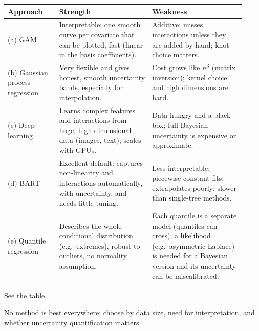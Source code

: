\documentclass[11pt]{article}
\begin{document}
\solution
\begin{center}
\small
\renewcommand{\arraystretch}{1.35}
\begin{tabular}{p{0.2\linewidth}p{0.36\linewidth}p{0.36\linewidth}}\toprule
Approach & Strength & Weakness\\\midrule
(a) GAM & Interpretable: one smooth curve per covariate that can be plotted; fast (linear in the basis coefficients). & Additive: misses interactions unless they are added by hand; knot choice matters.\\
(b) Gaussian process regression & Very flexible and gives honest, smooth uncertainty bands, especially for interpolation. & Cost grows like $n^3$ (matrix inversion); kernel choice and high dimensions are hard.\\
(c) Deep learning & Learns complex features and interactions from huge, high-dimensional data (images, text); scales with GPUs. & Data-hungry and a black box; full Bayesian uncertainty is expensive or approximate.\\
(d) BART & Excellent default: captures non-linearity and interactions automatically, with uncertainty, and needs little tuning. & Less interpretable; piecewise-constant fits; extrapolates poorly; slower than single-tree methods.\\
(e) Quantile regression & Describes the whole conditional distribution (e.g.\ extremes), robust to outliers, no normality assumption. & Each quantile is a separate model (quantiles can cross); a likelihood (e.g.\ asymmetric Laplace) is needed for a Bayesian version and its uncertainty can be miscalibrated.\\\bottomrule
\end{tabular}
\end{center}

\begin{answer}
See the table.
\end{answer}

\begin{takeaway}
No method is best everywhere: choose by data size, need for interpretation, and whether uncertainty quantification matters.
\end{takeaway}

\end{document}

